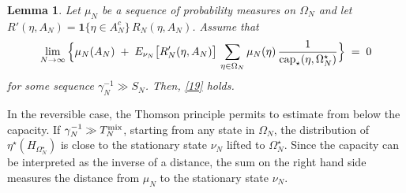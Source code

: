 \documentclass[reqno]{amsart}
\newtheorem{lemma}[theorem]{Lemma}
\begin{document}
\begin{lemma}
\label{s14}
Let $\mu_N$ be a sequence of probability measures on $\Omega_N$ and
let $R'(\eta, A_N) = {{\mathbf 1}}\{\eta\in A^c_N\}\, R_N(\eta, A_N)$. Assume
that
\begin{equation*}
\lim_{N\to\infty} \Big\{ \mu_N(A_N) \;+\; E_{\nu_N} \big[R'_N(\eta, A_N)\big]\,
\sum_{\eta\in \Omega_N} \mu_N(\eta) \,
\frac{1} {{{\rm cap}}_\star (\eta, \Omega^\star_N)} \Big\}\;=\; 0
\end{equation*}
for some sequence $\gamma^{-1}_N \gg S_N$. Then, \eqref{19} holds.
\end{lemma}

In the reversible case, the Thomson principle permits to estimate from
below the capacity.  If $\gamma^{-1}_N \gg T^{\rm mix}_N$, starting
from any state in $\Omega_N$, the distribution of
$\eta^\star(H_{\Omega^\star_N})$ is close to the stationary state
$\nu_N$ lifted to $\Omega^\star_N$. Since the capacity can be
interpreted as the inverse of a distance, the sum on the right hand
side measures the distance from $\mu_N$ to the stationary state
$\nu_N$.
\end{document}
